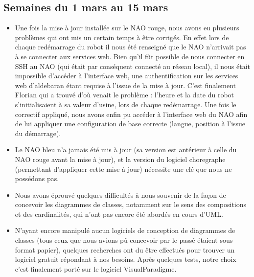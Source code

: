   \subsection{Semaines du 1 mars au 15 mars}
  \label{sub:Semaines du 1 mars au 15 mars}
    \begin{itemize}
      \item Une fois la mise à jour installée sur le NAO rouge, nous avons eu plusieurs problèmes qui ont mis un certain temps à être corrigés.
      En effet lors de chaque redémarrage du robot il nous été renseigné que le NAO n’arrivait pas à se connecter aux services web.
      Bien qu’il fût possible de nous connecter en SSH au NAO (qui était par conséquent connecté au réseau local),
      il nous était impossible d’accéder à l’interface web, une authentification sur les services web d’aldebaran étant requise à l’issue de la mise à jour.
      C’est finalement Florian qui a trouvé d’où venait le problème : l’heure et la date du robot s’initialisaient à sa valeur d’usine, lors de chaque redémarrage.
      Une fois le correctif appliqué, nous avons enfin pu accéder à l’interface web du NAO afin de lui appliquer une configuration de base correcte (langue, position à l'issue du démarrage).
      \item Le NAO bleu n’a jamais été mis à jour (sa version est antérieur à celle du NAO rouge avant la mise à jour),
      et la version du logiciel choregraphe (permettant d’appliquer cette mise à jour) nécessite une clé que nous ne possédons pas.
      \item Nous avons éprouvé quelques difficultés à nous souvenir de la façon de concevoir les diagrammes de classes,
      notamment sur le sens des compositions et des cardinalités, qui n'ont pas encore été abordés en cours d'UML.
      \item N'ayant encore manipulé aucun logiciels de conception de diagrammes de classes (tous ceux que nous avions pû concevoir par le passé étaient sous format papier),
      quelques recherches ont du être effectués pour trouver un logiciel gratuit répondant à nos besoins.
      Après quelques tests, notre choix c'est finalement porté sur le logiciel VisualParadigme.
    \end{itemize}
  \pagebreak



